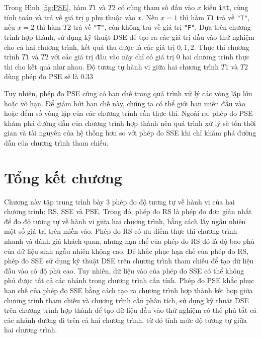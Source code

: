 Trong Hình \ref{fig:PSE}, hàm $ T1 $ và $ T2 $ có cùng tham số 
đầu vào $ x $ kiểu \texttt{int}, cùng tính toán và trả về giá trị 
$ y $ phụ thuộc vào $ x $. Nếu $ x = 1$ thì hàm $ T1 $ trả về 
\texttt{"T"}, nếu $ x = 2$ thì hàm $ T2 $ trả về \texttt{"T"}, 
còn không trả về giá trị \texttt{"F"}. Dựa trên chương trình hợp 
thành, sử dụng kỹ thuật DSE để tạo ra các giá trị đầu vào thử nghiệm 
cho cả hai chương trình, kết quả thu được là các giá trị $ 0, 1, 2 $. 
Thực thi chương trình $ T1 $ và $ T2 $ với các giá trị đầu vào này chỉ 
có giá trị $ 0 $ hai chương trình thực thi cho kết quả như nhau. Độ tương 
tự hành vi giữa hai chương trình $ T1 $ và $ T2 $ dùng phép đo PSE sẽ là $ 0.33 $
 

 Tuy nhiên, phép đo PSE cũng có hạn chế trong quá trình xử lý các 
 vòng lặp lớn hoặc vô hạn. Để giảm bớt hạn chế này, chúng ta có thể 
 giới hạn miền đầu vào hoặc đếm số vòng lặp của các chương trình 
 cần thực thi. Ngoài ra, phép đo PSE khám phá đường dẫn của chương 
 trình hợp thành nên quá trình xử lý sẽ tốn thời gian và tài nguyên 
 của hệ thống hơn so với phép đo SSE khi chỉ khám phá đường dẫn của 
 chương trình tham chiếu.

 \section*{Tổng kết chương}
Chương này tập trung trình bày $3$ phép đo độ tương tự về hành vi 
của hai chương trình: RS, SSE và PSE. Trong đó, phép đo RS là phép đo 
đơn giản nhất để đo độ tương tự về hành vi giữa hai chương trình, bằng
cách lấy ngẫu nhiên một số giá trị trên miền vào. Phép đo RS có ưu điểm 
thực thi chương trình nhanh và đánh giá khách quan, nhưng hạn chế của 
phép đo RS đó là độ bao phủ của dữ liệu sinh ngẫu nhiên không cao. 
Để khắc phục hạn chế của phép đo RS, phép đo SSE sử dụng kỹ thuật 
DSE trên chương trình tham chiếu để tạo dữ liệu đầu vào có độ phủ
cao. Tuy nhiên, dữ liệu vào của phép đo SSE có thể 
không phủ được tất cả các nhánh trong chương trình cần tính. 
Phép đo PSE khắc phục hạn chế của phép đo SSE bằng cách tạo ra chương trình 
hợp thành kết hợp giữa chương trình tham chiếu và chương trình cần phân tích, 
sử dụng kỹ thuật DSE trên chương trình hợp thành để tạo dữ liệu đầu vào thử 
nghiệm có thể phủ tất cả các nhánh đường đi trên cả hai chương trình, 
từ đó tính mức độ tương tự giữa hai chương trình. 




  
